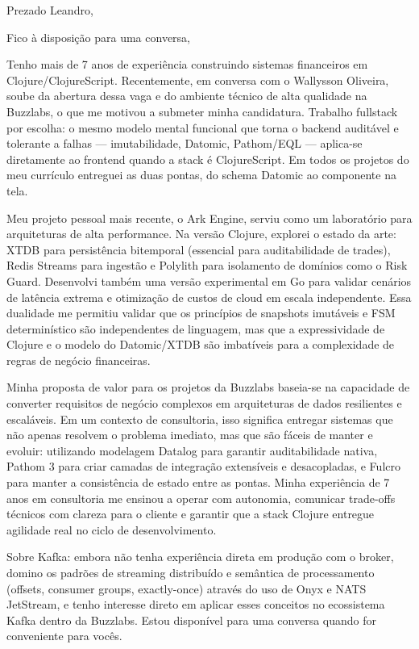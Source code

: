 \documentclass[10pt,a4paper,sans]{moderncv}
\begin{document}
\makecvtitle

\vspace{-1em}
\date{\today}
\opening{Prezado Leandro,}
\closing{Fico à disposição para uma conversa,}
\makelettertitle

Tenho mais de 7 anos de experiência construindo sistemas financeiros em Clojure/ClojureScript. Recentemente, em conversa com o Wallysson Oliveira, soube da abertura dessa vaga e do ambiente técnico de alta qualidade na Buzzlabs, o que me motivou a submeter minha candidatura. Trabalho fullstack por escolha: o mesmo modelo mental funcional que torna o backend auditável e tolerante a falhas --- imutabilidade, Datomic, Pathom/EQL --- aplica-se diretamente ao frontend quando a stack é ClojureScript. Em todos os projetos do meu currículo entreguei as duas pontas, do schema Datomic ao componente na tela.

Meu projeto pessoal mais recente, o Ark Engine, serviu como um laboratório para arquiteturas de alta performance. Na versão Clojure, explorei o estado da arte: XTDB para persistência bitemporal (essencial para auditabilidade de trades), Redis Streams para ingestão e Polylith para isolamento de domínios como o Risk Guard. Desenvolvi também uma versão experimental em Go para validar cenários de latência extrema e otimização de custos de cloud em escala independente. Essa dualidade me permitiu validar que os princípios de snapshots imutáveis e FSM determinístico são independentes de linguagem, mas que a expressividade de Clojure e o modelo do Datomic/XTDB são imbatíveis para a complexidade de regras de negócio financeiras.

Minha proposta de valor para os projetos da Buzzlabs baseia-se na capacidade de converter requisitos de negócio complexos em arquiteturas de dados resilientes e escaláveis. Em um contexto de consultoria, isso significa entregar sistemas que não apenas resolvem o problema imediato, mas que são fáceis de manter e evoluir: utilizando modelagem Datalog para garantir auditabilidade nativa, Pathom 3 para criar camadas de integração extensíveis e desacopladas, e Fulcro para manter a consistência de estado entre as pontas. Minha experiência de 7 anos em consultoria me ensinou a operar com autonomia, comunicar trade-offs técnicos com clareza para o cliente e garantir que a stack Clojure entregue agilidade real no ciclo de desenvolvimento.

Sobre Kafka: embora não tenha experiência direta em produção com o broker, domino os padrões de streaming distribuído e semântica de processamento (offsets, consumer groups, exactly-once) através do uso de Onyx e NATS JetStream, e tenho interesse direto em aplicar esses conceitos no ecossistema Kafka dentro da Buzzlabs. Estou disponível para uma conversa quando for conveniente para vocês.

\makeletterclosing
\end{document}
